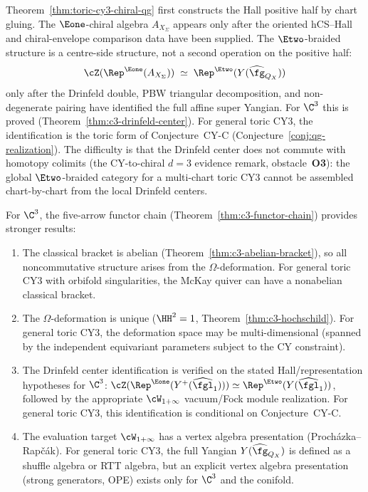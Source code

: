 \begin{remark}
\label{rem:toric-e2-centre-scope}
Theorem~\ref{thm:toric-cy3-chiral-qg} first constructs the Hall
positive half by chart gluing. The $\Eone$-chiral algebra
$A_{X_\Sigma}$ appears only after the oriented hCS--Hall and
chiral-envelope comparison data have been supplied. The
$\Etwo$-braided structure is a centre-side structure, not a second
operation on the positive half:
\[
 \cZ(\Rep^{\Eone}(A_{X_\Sigma}))
 \;\simeq\;
 \Rep^{\Etwo}(Y(\widehat{\fg}_{Q_X}))
\]
only after the Drinfeld double, PBW triangular decomposition, and
non-degenerate pairing have identified the full affine super Yangian.
For $\C^3$ this is proved
(Theorem~\ref{thm:c3-drinfeld-center}). For general toric CY3, the
identification is the toric form of Conjecture~CY-C
(Conjecture~\ref{conj:qg-realization}). The difficulty is that the
Drinfeld center does not commute with homotopy colimits (the
CY-to-chiral $d=3$ evidence remark, obstacle~\textbf{O3}): the global
$\Etwo$-braided category for a multi-chart toric CY3 cannot be assembled
chart-by-chart from the local Drinfeld centers.
\end{remark}


\begin{remark}
\label{rem:c3-vs-general-toric}
For $\C^3$, the five-arrow functor chain
(Theorem~\ref{thm:c3-functor-chain}) provides stronger results:
\begin{enumerate}[label=\textup{(\roman*)}]
 \item The classical bracket is abelian
 (Theorem~\ref{thm:c3-abelian-bracket}), so all noncommutative
 structure arises from the $\Omega$-deformation.
 For general toric CY3 with orbifold singularities,
 the McKay quiver can have a nonabelian classical bracket.
 \item The $\Omega$-deformation is unique ($\HH^2 = 1$,
 Theorem~\ref{thm:c3-hochschild}). For general toric CY3,
 the deformation space may be multi-dimensional
 (spanned by the independent equivariant parameters
 subject to the CY constraint).
 \item The Drinfeld center identification is verified on the
 stated Hall/representation hypotheses for $\C^3$:
 $\cZ(\Rep^{\Eone}(Y^+(\widehat{\fgl}_1)))
 \simeq \Rep^{\Etwo}(Y(\widehat{\fgl}_1))$, followed by the
 appropriate $\cW_{1+\infty}$ vacuum/Fock module realization. For general toric
 CY3, this identification is conditional on Conjecture~CY-C.
 \item The evaluation target $\cW_{1+\infty}$ has a vertex algebra
 presentation (Proch\'azka--Rap\v{c}\'ak). For general toric CY3,
 the full Yangian $Y(\widehat{\fg}_{Q_X})$ is defined as a
 shuffle algebra or RTT algebra, but an explicit vertex algebra
 presentation (strong generators, OPE) exists only for
 $\C^3$ and the conifold.
\end{enumerate}
\end{remark}


